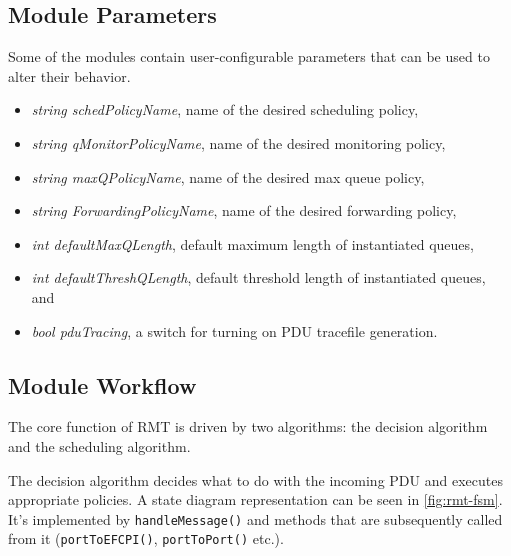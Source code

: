        \subsection{Module Parameters}
            Some of the modules contain user-configurable parameters that can be used to alter their behavior.
            \begin{itemize}
                \item \emph{string schedPolicyName}, name of the desired scheduling policy,
                \item \emph{string qMonitorPolicyName}, name of the desired monitoring policy,
                \item \emph{string maxQPolicyName}, name of the desired max queue policy,
                \item \emph{string ForwardingPolicyName}, name of the desired forwarding policy,
                \item \emph{int defaultMaxQLength}, default maximum length of instantiated queues,
                \item \emph{int defaultThreshQLength}, default threshold length of instantiated queues, and
                \item \emph{bool pduTracing}, a switch for turning on PDU tracefile generation.
            \end{itemize}

        \subsection{Module Workflow}

            The core function of RMT is driven by two algorithms: the decision algorithm and the scheduling algorithm.

            The decision algorithm decides what to do with the incoming PDU and executes appropriate policies. A state diagram representation can be seen in \ref{fig:rmt-fsm}. It's implemented by \texttt{handleMessage()} and methods that are subsequently called from it (\texttt{portToEFCPI()}, \texttt{portToPort()} etc.).

